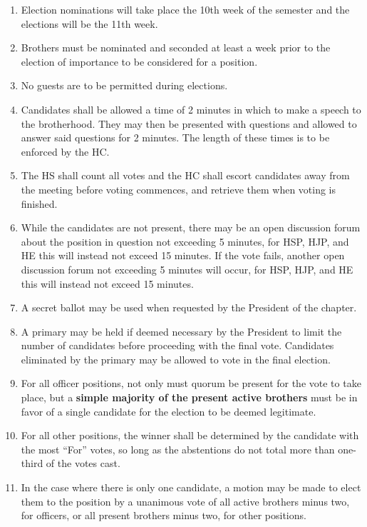 \documentclass{article}
\begin{document}
\begin{enumerate}
    \item Election nominations will take place the 10th week of the semester and the elections will be the 11th week.
    \item Brothers must be nominated and seconded at least a week prior to the election of  importance to be considered for a position.
    \item No guests are to be permitted during elections.
    \item Candidates shall be allowed a time of 2 minutes in which to make a speech to the brotherhood. They may then be presented with questions and allowed to answer said questions for 2 minutes. The length of these times is to be enforced by the HC. 
    \item The HS shall count all votes and the HC shall escort candidates away from the meeting before voting commences, and retrieve them when voting is finished.
    \item While the candidates are not present, there may be an open discussion forum about the position in question not exceeding 5 minutes, for HSP, HJP, and HE this will instead not exceed 15 minutes. If the vote fails, another open discussion forum not exceeding 5 minutes will occur, for HSP, HJP, and HE this will instead not exceed 15 minutes. 
    \item A secret ballot may be used when requested by the President of the chapter.
    \item A primary may be held if deemed necessary by the President to limit the number of candidates before proceeding with the final vote. Candidates eliminated by the primary may be allowed to vote in the final election.
    \item For all officer positions, not only must quorum be present for the vote to take place, but a \textbf{simple majority of the present active brothers} must be in favor of a single candidate for the election to be deemed legitimate.
    \item For all other positions, the winner shall be determined by the candidate with the most “For” votes, so long as the abstentions do not total more than one-third of the votes cast.
    \item In the case where there is only one candidate, a motion may be made to elect them to the position by a unanimous vote of all active brothers minus two, for officers, or all present brothers minus two, for other positions.
\end{enumerate}
\end{document}
